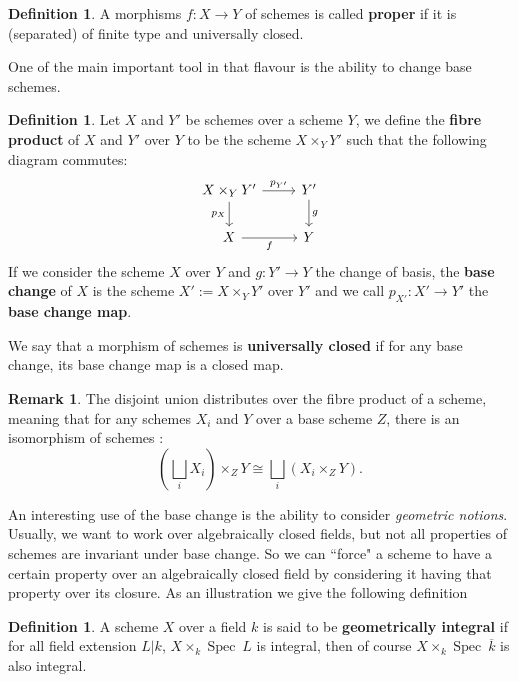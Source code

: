 \documentclass{article}
\theoremstyle{plain}
\theoremstyle{definition}
\newtheorem{definition}[theorem]{Definition}
\newtheorem{remark}{Remark}
\DeclareMathOperator{\Spec}{Spec}
\begin{document}
\begin{definition}
    A morphisms $f:X\rightarrow Y$ of schemes is called \textbf{proper} if it is (separated) of finite type and universally closed. 
\end{definition}

\noindent One of the main important tool in that flavour is the ability to change base schemes.

\begin{definition}
    Let $X$ and $Y'$ be schemes over a scheme $Y$, we define the \textbf{fibre product} of $X$ and $Y'$ over $Y$ to be the scheme  $X\times_YY'$ such that the following diagram commutes:
    \[
    \begin{tikzcd}
        X\times_Y Y' \arrow[r,"p_{Y'}"] \arrow[d, "p_X"']
        & Y' \arrow[d,"g"] \\
        X \arrow[r,"f"']
        &  Y
    \end{tikzcd}
    \]
    If we consider the scheme $X$ over $Y$ and $g:Y'\rightarrow Y$ the change of basis, the \textbf{base change} of $X$ is the scheme $X' :=X\times_YY'$ over $Y'$ and we call $p_{X'}: X' \rightarrow Y'$ the \textbf{base change map}.
\end{definition}

\noindent We say that a morphism of schemes is \textbf{universally closed} if for any base change, its base change map is a closed map.

\begin{remark}
    The disjoint union distributes over the fibre product of a scheme, meaning that for any schemes $X_i$ and $Y$ over a base scheme $Z$, there is an isomorphism of schemes :
    $$(\bigsqcup_i X_i) \times_Z Y \cong \bigsqcup_i(X_i\times_Z Y) .$$
\end{remark}

\noindent An interesting use of the base change is the ability to consider \textit{geometric notions}.
Usually, we want to work over algebraically closed fields, but not all properties of schemes are invariant under base change. 
So we can “force" a scheme to have a certain property over an algebraically closed field by considering it having that property over its closure.
As an illustration we give the following definition
\begin{definition}
\label{geometrically_integral}
    A scheme $X$ over a field $k$ is said to be \textbf{geometrically integral} if for all field extension $L|k$, $X\times_k \Spec\: L$ is integral, then of course $X\times_k \Spec\: \overline{k}$ is also integral.
\end{definition}
\end{document}
